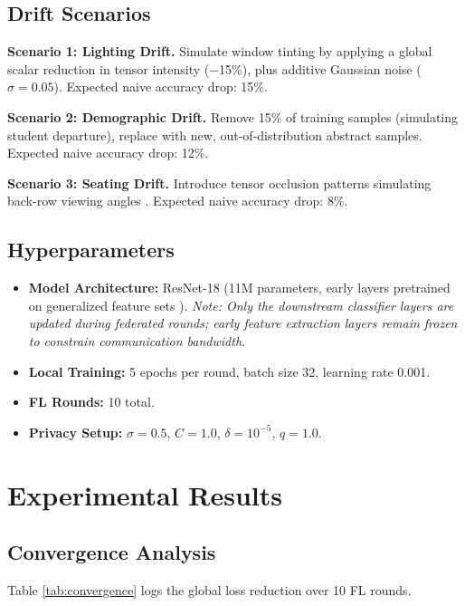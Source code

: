 \documentclass[conference]{IEEEtran}
\begin{document}
\subsection{Drift Scenarios}
\textbf{Scenario 1: Lighting Drift.} Simulate window tinting by applying a global scalar reduction in tensor intensity ($-$15\%), plus additive Gaussian noise ($\sigma=0.05$). Expected naive accuracy drop: 15\%.

\textbf{Scenario 2: Demographic Drift.} Remove 15\% of training samples (simulating student departure), replace with new, out-of-distribution abstract samples. Expected naive accuracy drop: 12\%.

\textbf{Scenario 3: Seating Drift.} Introduce tensor occlusion patterns simulating back-row viewing angles \cite{b27}. Expected naive accuracy drop: 8\%.

\subsection{Hyperparameters}
\begin{itemize}
    \item \textbf{Model Architecture:} ResNet-18 (11M parameters, early layers pretrained on generalized feature sets \cite{b28}). \textit{Note: Only the downstream classifier layers are updated during federated rounds; early feature extraction layers remain frozen to constrain communication bandwidth.}
    \item \textbf{Local Training:} 5 epochs per round, batch size 32, learning rate 0.001.
    \item \textbf{FL Rounds:} 10 total.
    \item \textbf{Privacy Setup:} $\sigma=0.5$, $C=1.0$, $\delta=10^{-5}$, $q=1.0$.
\end{itemize}

\section{Experimental Results}

\subsection{Convergence Analysis}

Table \ref{tab:convergence} logs the global loss reduction over 10 FL rounds.
\end{document}
